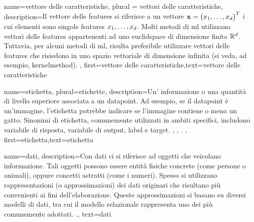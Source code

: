 {name={vettore delle caratteristiche}, plural = {vettori delle caratteristiche},
	description={Il vettore delle \glspl{feature} si riferisce a un vettore ${\bf x} = \big(x_{1},\ldots,x_{d}\big)^{T}$ 
	i cui elementi sono singole \glspl{feature} $x_{1},\ldots,x_{d}$. Molti metodi di \gls{ml}  
	utilizzano vettori delle \glspl{feature} appartenenti ad uno \gls{euclidspace} di dimensione finita $\mathbb{R}^{d}$. 
	Tuttavia, per alcuni metodi di \gls{ml}, risulta preferibile utilizzare vettori delle \glspl{feature} che risiedono
	 in uno spazio vettoriale di dimensione infinita (si veda, ad esempio, \gls{kernelmethod}). 
		}, 
		first={vettore delle caratteristiche},text={vettore delle caratteristiche}  
}


{name={etichetta}, plural={etichette},
	description={Un' informazione o una quantità di livello superiore associata a un \gls{datapoint}.
		Ad esempio, se il \gls{datapoint} è un'immagine, l'etichetta potrebbe indicare se l'immagine contiene o meno un gatto.
		Sinonimi di etichetta, comunemente utilizzati in ambiti specifici, 
		includono variabile di risposta, variabile di output, label e target. \cite{Gujarati2021}, \cite{Dodge2003}, \cite{Everitt2022}.
 },
	first={etichetta},text={etichetta}  
}


{name={dati},
	 description={Con dati ci si riferisce ad oggetti che veicolano informazione. Tali 
	 	oggetti possono essere entità fisiche concrete (come persone o animali), 
		oppure concetti astratti (come i numeri). Spesso si utilizzano rappresentazioni 
		(o approssimazioni) dei dati originari che risultano più convenienti ai fini dell’elaborazione.
	 	Queste approssimazioni si basano su diversi modelli di dati, 
		tra cui il modello relazionale rappresenta uno dei più comunemente adottati. \cite{codd1970relational}.}, 
	text={dati}
}

